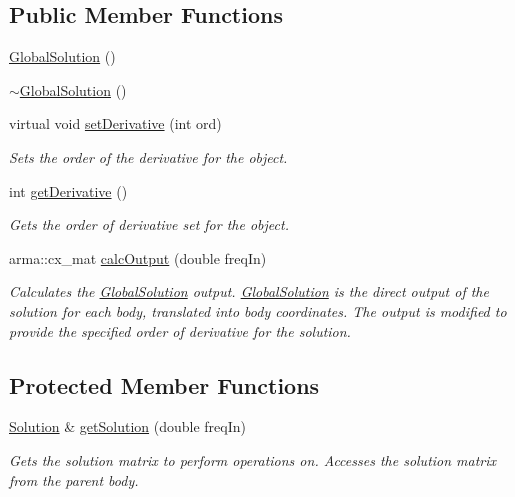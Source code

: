 \subsection*{Public Member Functions}
\begin{DoxyCompactItemize}
\item 
\hyperlink{classosea_1_1ofreq_1_1_global_solution_a27fcfb056c30fc07f8937bc71ec677e6}{Global\-Solution} ()
\item 
\hyperlink{classosea_1_1ofreq_1_1_global_solution_aea630b237ced06e04c5ea00bf1bb9398}{$\sim$\-Global\-Solution} ()
\item 
virtual void \hyperlink{classosea_1_1ofreq_1_1_global_solution_a537163391f1f55d073720b20f69acfa5}{set\-Derivative} (int ord)
\begin{DoxyCompactList}\small\item\em Sets the order of the derivative for the object. \end{DoxyCompactList}\item 
int \hyperlink{classosea_1_1ofreq_1_1_global_solution_abf8fa956895f2728820d65fda2f5304d}{get\-Derivative} ()
\begin{DoxyCompactList}\small\item\em Gets the order of derivative set for the object. \end{DoxyCompactList}\item 
arma\-::cx\-\_\-mat \hyperlink{classosea_1_1ofreq_1_1_global_solution_adf90922a97153ce858da530e20bc3f4d}{calc\-Output} (double freq\-In)
\begin{DoxyCompactList}\small\item\em Calculates the \hyperlink{classosea_1_1ofreq_1_1_global_solution}{Global\-Solution} output. \hyperlink{classosea_1_1ofreq_1_1_global_solution}{Global\-Solution} is the direct output of the solution for each body, translated into body coordinates. The output is modified to provide the specified order of derivative for the solution. \end{DoxyCompactList}\end{DoxyCompactItemize}
\subsection*{Protected Member Functions}
\begin{DoxyCompactItemize}
\item 
\hyperlink{classosea_1_1ofreq_1_1_solution}{Solution} \& \hyperlink{classosea_1_1ofreq_1_1_global_solution_a43a8caad9f88e3b468c3e9a364b45500}{get\-Solution} (double freq\-In)
\begin{DoxyCompactList}\small\item\em Gets the solution matrix to perform operations on. Accesses the solution matrix from the parent body. \end{DoxyCompactList}\end{DoxyCompactItemize}
